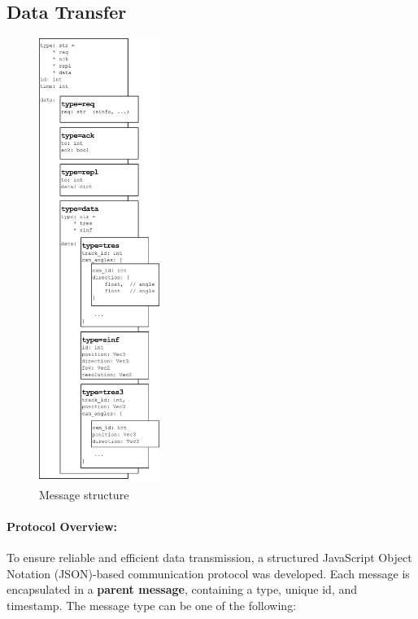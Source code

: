 \newpage

\subsection{Data Transfer}\label{subsec:DataTransfer}

\begin{figure}
	\centering
	\vspace{-60pt} %
	\includegraphics[width=0.35\textwidth]{figures/SS_Protocol_Message}
	\caption{Message structure}
	\label{fig:ssprotocolmessage}
\end{figure}


\paragraph{Protocol Overview:}

To ensure reliable and efficient data transmission, a structured JavaScript Object Notation (JSON)-based communication protocol was developed. Each message is encapsulated in a \textbf{parent message}, containing a type, unique \acrfull{id}, and timestamp. The message type can be one of the following:

